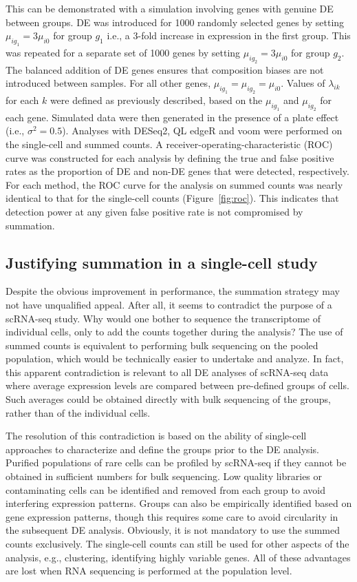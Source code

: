 \documentclass[oupdraft]{bio}
\begin{document}
This can be demonstrated with a simulation involving genes with genuine DE between groups.
DE was introduced for 1000 randomly selected genes by setting $\mu_{ig_1} = 3\mu_{i0}$ for group $g_1$ i.e., a 3-fold increase in expression in the first group.
This was repeated for a separate set of 1000 genes by setting $\mu_{ig_2} = 3\mu_{i0}$ for group $g_2$.
The balanced addition of DE genes ensures that composition biases \citep{robinson2010scaling} are not introduced between samples.
For all other genes, $\mu_{ig_1}=\mu_{ig_2}=\mu_{i0}$.
Values of $\lambda_{ik}$ for each $k$ were defined as previously described, based on the $\mu_{ig_1}$ and $\mu_{ig_2}$ for each gene.
Simulated data were then generated in the presence of a plate effect (i.e., $\sigma^2=0.5$).
Analyses with DESeq2, QL edgeR and voom were performed on the single-cell and summed counts.
A receiver-operating-characteristic (ROC) curve was constructed for each analysis by defining the true and false positive rates as the proportion of DE and non-DE genes that were detected, respectively.
For each method, the ROC curve for the analysis on summed counts was nearly identical to that for the single-cell counts (Figure~\ref{fig:roc}).
This indicates that detection power at any given false positive rate is not compromised by summation.

\subsection{Justifying summation in a single-cell study}
Despite the obvious improvement in performance, the summation strategy may not have unqualified appeal.
After all, it seems to contradict the purpose of a scRNA-seq study. 
Why would one bother to sequence the transcriptome of individual cells, only to add the counts together during the analysis?
The use of summed counts is equivalent to performing bulk sequencing on the pooled population, which would be technically easier to undertake and analyze.
In fact, this apparent contradiction is relevant to all DE analyses of scRNA-seq data where average expression levels are compared between pre-defined groups of cells.
Such averages could be obtained directly with bulk sequencing of the groups, rather than of the individual cells.

The resolution of this contradiction is based on the ability of single-cell approaches to characterize and define the groups prior to the DE analysis.
Purified populations of rare cells can be profiled by scRNA-seq if they cannot be obtained in sufficient numbers for bulk sequencing.
Low quality libraries or contaminating cells can be identified and removed from each group to avoid interfering expression patterns.
Groups can also be empirically identified based on gene expression patterns, though this requires some care to avoid circularity in the subsequent DE analysis.
Obviously, it is not mandatory to use the summed counts exclusively. 
The single-cell counts can still be used for other aspects of the analysis, e.g., clustering, identifying highly variable genes.
All of these advantages are lost when RNA sequencing is performed at the population level.
\end{document}
